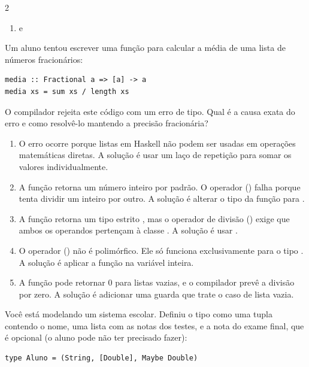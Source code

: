 \documentclass[a4paper,10pt,brazil]{article}
\begin{document}
\begin{multicols}{2}
\begin{enumerate}
  \item {} e 


\end{enumerate}

Um aluno tentou escrever uma função para calcular a média de uma lista de números fracionários:
\begin{verbatim}
media :: Fractional a => [a] -> a
media xs = sum xs / length xs
\end{verbatim}
O compilador rejeita este código com um erro de tipo. Qual é a causa exata do erro e como resolvê-lo mantendo a precisão fracionária?

\begin{enumerate}
  \item O erro ocorre porque listas em Haskell não podem ser usadas em operações matemáticas diretas. A solução é usar um laço de repetição  para somar os valores individualmente.

  \item A função  retorna um número inteiro por padrão. O operador (\haskellinline{/}) falha porque tenta dividir um inteiro por outro. A solução é alterar o tipo da função para .

  \item A função  retorna um tipo estrito , mas o operador de divisão (\haskellinline{/}) exige que ambos os operandos pertençam à classe . A solução é usar .

  \item O operador (\haskellinline{/}) não é polimórfico. Ele só funciona exclusivamente para o tipo . A solução é aplicar a função  na variável  inteira.

  \item A função  pode retornar 0 para listas vazias, e o compilador prevê a divisão por zero. A solução é adicionar uma guarda que trate o caso de lista vazia.


\end{enumerate}

Você está modelando um sistema escolar. Definiu o tipo  como uma tupla contendo o nome, uma lista com as notas dos testes, e a nota do exame final, que é opcional (o aluno pode não ter precisado fazer):
\begin{verbatim}
type Aluno = (String, [Double], Maybe Double)
\end{verbatim}


\end{multicols}
\end{document}
